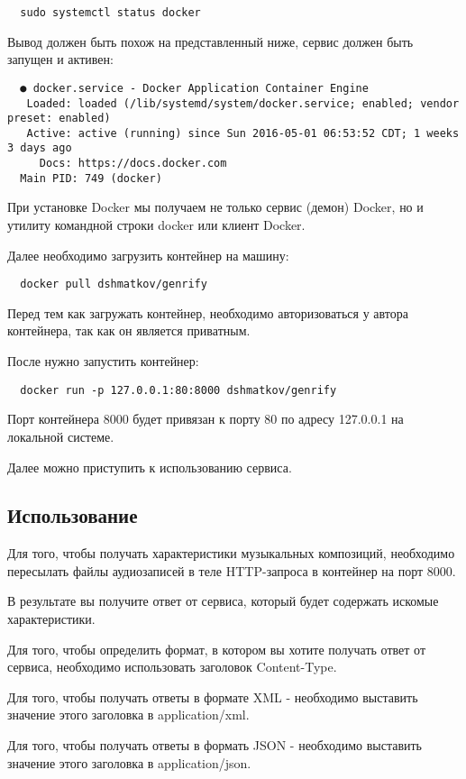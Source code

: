 \begin{lstlisting}
  sudo systemctl status docker
\end{lstlisting}

Вывод должен быть похож на представленный ниже, сервис должен быть запущен и активен:

\begin{lstlisting}
  ● docker.service - Docker Application Container Engine
   Loaded: loaded (/lib/systemd/system/docker.service; enabled; vendor preset: enabled)
   Active: active (running) since Sun 2016-05-01 06:53:52 CDT; 1 weeks 3 days ago
     Docs: https://docs.docker.com
  Main PID: 749 (docker)
\end{lstlisting}

При установке Docker мы получаем не только сервис (демон) Docker, но и утилиту командной строки docker или клиент Docker.

Далее необходимо загрузить контейнер на машину:

\begin{lstlisting}
  docker pull dshmatkov/genrify
\end{lstlisting}

Перед тем как загружать контейнер, необходимо авторизоваться у автора контейнера, так как он является приватным.

После нужно запустить контейнер:

\begin{lstlisting}
  docker run -p 127.0.0.1:80:8000 dshmatkov/genrify
\end{lstlisting}

Порт контейнера 8000 будет привязан к порту 80 по адресу 127.0.0.1 на локальной системе.

Далее можно приступить к использованию сервиса.

\subsection{Использование}
\label{sec:manual:usage}

Для того, чтобы получать характеристики музыкальных композиций, необходимо пересылать файлы аудиозаписей в теле HTTP-запроса в контейнер на порт 8000.

В результате вы получите ответ от сервиса, который будет содержать искомые характеристики.

Для того, чтобы определить формат, в котором вы хотите получать ответ от сервиса, необходимо использовать заголовок Content-Type.

Для того, чтобы получать ответы в формате XML - необходимо выставить значение этого заголовка в application/xml.

Для того, чтобы получать ответы в формать JSON - необходимо выставить значение этого заголовка в application/json.
